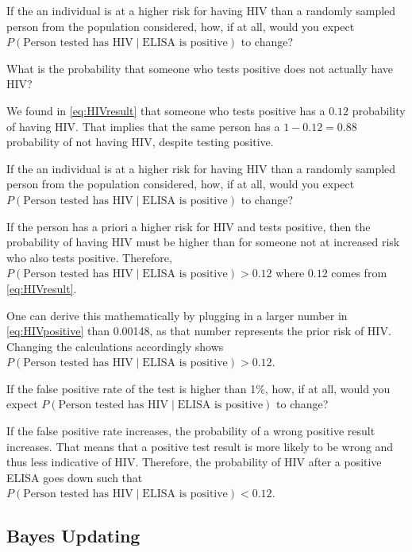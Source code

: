 \documentclass[]{book}
\theoremstyle{definition}
\theoremstyle{definition}
\theoremstyle{remark}
\let\BeginKnitrBlock\begin \let\EndKnitrBlock\end
\begin{document}
If the an individual is at a higher risk for having HIV than a randomly
sampled person from the population considered, how, if at all, would you
expect \(P(\text{Person tested has HIV} \mid \text{ELISA is positive})\)
to change?

\BeginKnitrBlock{example}
\protect\hypertarget{ex:unnamed-chunk-3}{}{\label{ex:unnamed-chunk-3}}What
is the probability that someone who tests positive does not actually
have HIV?
\EndKnitrBlock{example}

We found in \eqref{eq:HIVresult} that someone who tests positive has a
\(0.12\) probability of having HIV. That implies that the same person
has a \(1-0.12=0.88\) probability of not having HIV, despite testing
positive.

\BeginKnitrBlock{example}
\protect\hypertarget{ex:unnamed-chunk-4}{}{\label{ex:unnamed-chunk-4}}If the
an individual is at a higher risk for having HIV than a randomly sampled
person from the population considered, how, if at all, would you expect
\(P(\text{Person tested has HIV} \mid \text{ELISA is positive})\) to
change?
\EndKnitrBlock{example}

If the person has a priori a higher risk for HIV and tests positive,
then the probability of having HIV must be higher than for someone not
at increased risk who also tests positive. Therefore,
\(P(\text{Person tested has HIV} \mid \text{ELISA is positive}) > 0.12\)
where \(0.12\) comes from \eqref{eq:HIVresult}.

One can derive this mathematically by plugging in a larger number in
\eqref{eq:HIVpositive} than 0.00148, as that number represents the prior
risk of HIV. Changing the calculations accordingly shows
\(P(\text{Person tested has HIV} \mid \text{ELISA is positive}) > 0.12\).

\BeginKnitrBlock{example}
\protect\hypertarget{ex:unnamed-chunk-5}{}{\label{ex:unnamed-chunk-5}}If the
false positive rate of the test is higher than 1\%, how, if at all,
would you expect
\(P(\text{Person tested has HIV} \mid \text{ELISA is positive})\) to
change?
\EndKnitrBlock{example}

If the false positive rate increases, the probability of a wrong
positive result increases. That means that a positive test result is
more likely to be wrong and thus less indicative of HIV. Therefore, the
probability of HIV after a positive ELISA goes down such that
\(P(\text{Person tested has HIV} \mid \text{ELISA is positive}) < 0.12\).

\subsection{Bayes Updating}\label{bayes-updating}
\end{document}

